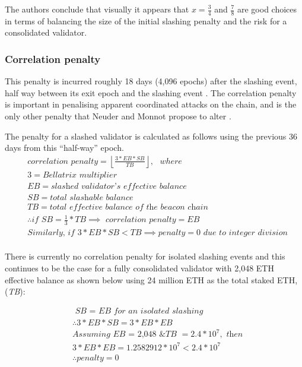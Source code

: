 The authors conclude that visually it appears that $x = \frac{3}{4}$ and $\frac{7}{8}$ are good choices in terms of balancing the size of the initial slashing penalty and the risk for a consolidated validator.

\subsubsection*{Correlation penalty}
This penalty is incurred roughly 18 days (4,096 epochs) after the slashing event, half way between its exit epoch and the slashing event \cite{Edgington2023}. The correlation penalty is important in penalising apparent coordinated attacks on the chain, and is the only other penalty that Neuder and Monnot propose to alter \cite{Neuder2023d}.

The penalty for a slashed validator is calculated as follows using the previous 36 days from this ``half-way'' epoch.
\begin{equation*}
\begin{split}
& \textit{correlation penalty} = \left\lfloor \frac{3*EB*SB}{TB} \right\rfloor, \texttt{ } where \\
& 3 = \textit{Bellatrix multiplier} \\
& EB = \textit{slashed validator's effective balance} \\
& SB = \textit{total slashable balance} \\
& TB = \textit{total effective balance of the beacon chain} \\
& \therefore \textit{if SB} = \frac{1}{3} * TB \implies \textit{ correlation penalty} = EB \\
& \textit{Similarly, if } 3*EB*SB <  TB \implies penalty = 0 \textit{ due to integer division} \\
\end{split}
\end{equation*}

There is currently no correlation penalty for isolated slashing events and this continues to be the case for a fully consolidated validator with 2,048 ETH effective balance as shown below using 24 million ETH as the total staked ETH, (\textit{TB}):

\begin{equation*}
\begin{split}
& \textit{ SB = EB for an isolated slashing} \\
& \therefore  3*EB*SB =  3*EB*EB \\
& \textit{Assuming EB = 2,048 \& TB } = 2.4 * 10^7, \textit{ then} \\
& 3*EB*EB = 1.2582912 * 10^7 < 2.4 * 10^7 \\
& \therefore penalty = 0
\end{split}
\end{equation*}


